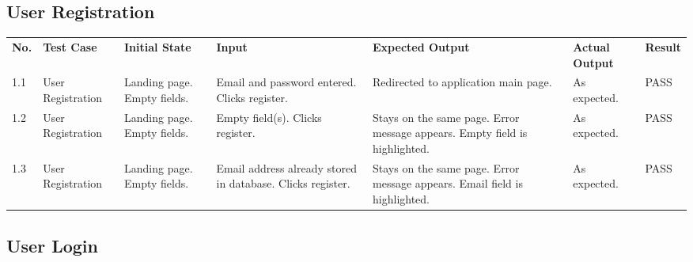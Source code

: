 \documentclass[12pt]{article}
\begin{document}
\subsection{User Registration} 

\begin{longtable}{|p{0.5cm}|p{1.5cm}|p{1.5cm}|p{3.5cm}|p{4cm}|p{2cm}|p{1.5cm}|}
\hline
\textbf{No.} & \textbf{Test Case}  & \textbf{Initial State} & \textbf{Input} & \textbf{Expected Output} & \textbf{Actual Output} & \textbf{Result}\\ 
1.1 & User Registration & Landing page. Empty fields. & Email and password entered. Clicks register. & Redirected to application main page. & As expected. & PASS \\ 
\hline
1.2 & User Registration & Landing page. Empty fields. & Empty field(s). Clicks register. & Stays on the same page. Error message appears. Empty field is highlighted. & As expected. & PASS \\
\hline
1.3 & User Registration & Landing page. Empty fields. & Email address already stored in database. Clicks register. & Stays on the same page. Error message appears. Email field is highlighted. & As expected. & PASS \\
\hline
\end{longtable}



\subsection{User Login}
\end{document}
